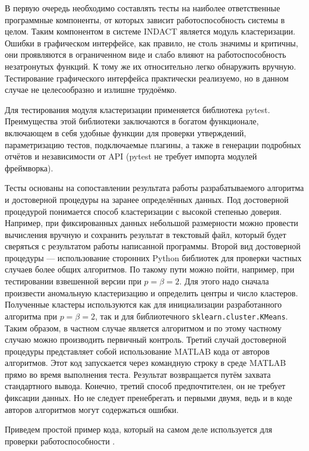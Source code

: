 \documentclass[12pt]{diploma}
\begin{document}
	В первую очередь необходимо составлять тесты на наиболее ответственные программные компоненты, от которых зависит работоспособность системы в целом. Таким компонентом в системе INDACT является модуль кластеризации. Ошибки в графическом интерфейсе, как правило, не столь значимы и критичны, они проявляются в ограниченном виде и слабо влияют на работоспособность незатронутых функций. К тому же их относительно легко обнаружить вручную. Тестирование графического интерфейса практически реализуемо, но в данном случае не целесообразно и излишне трудоёмко.
	
	Для тестирования модуля кластеризации применяется библиотека pytest. Преимущества этой библиотеки заключаются в богатом функционале, включающем в себя удобные функции для проверки утверждений, параметризацию тестов, подключаемые плагины, а также в генерации подробных отчётов и независимости от API (pytest не требует импорта модулей фреймворка). 
	
	Тесты основаны на сопоставлении результата работы разрабатываемого алгоритма и достоверной процедуры на заранее определённых данных. Под достоверной процедурой понимается способ кластеризации с высокой степенью доверия. Например, при фиксированных данных небольшой размерности можно провести вычисления вручную и сохранить результат в текстовый файл, который будет сверяться с результатом работы написанной программы. Второй вид достоверной процедуры --- использование сторонних Python библиотек для проверки частных случаев более общих алгоритмов. По такому пути можно пойти, например, при тестировании взвешенной версии \kmeans при $ p=\beta=2 $. Для этого надо сначала произвести аномальную кластеризацию и определить центры и число кластеров. Полученные кластеры используются как для инициализации разработанного алгоритма при $ p=\beta=2 $, так и для библиотечного \texttt{sklearn.cluster.KMeans}. Таким образом, в частном случае \imwkmeanspb является алгоритмом \kmeans и по этому частному случаю можно производить первичный контроль. Третий случай достоверной процедуры представляет собой использование MATLAB кода от авторов алгоритмов. Этот код запускается через командную строку в среде MATLAB  прямо во время выполнения теста. Результат возвращается путём захвата стандартного вывода. Конечно, третий способ предпочтителен, он не требует фиксации данных. Но не следует пренебрегать и первыми двумя, ведь и в коде авторов алгоритмов могут содержаться ошибки. 
	
	Приведем простой пример кода, который на самом деле используется для проверки работоспособности \AWard. 
	
\end{document}
